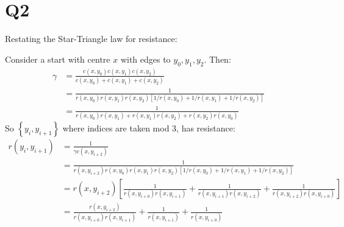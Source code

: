 \documentclass[a4paper, 11pt]{article}
\def\set#1{\left\{ #1 \right\}}
\begin{document}
\pagebreak
\section*{Q2}
Restating the Star-Triangle law for resistance:
\begin{mdframed}
	Consider a start with centre $x$ with edges to $y_0,y_1,y_2$. Then:
	\begin{align*}
		\gamma
		 & = \frac{c(x,y_0)c(x,y_1)c(x,y_2)}{c(x,y_0)+c(x,y_1)+c(x,y_2)}                       \\
		 & = \frac{1}{r(x,y_0)r(x,y_1)r(x,y_2)\left[ 1/r(x,y_0)+1/r(x,y_1)+1/r(x,y_2) \right]} \\
		 & = \frac1{r(x,y_0)r(x,y_1) + r(x,y_1)r(x,y_2) + r(x,y_2)r(x,y_0)}
	\end{align*}
	So $\set{y_i,y_{i+1}}$ where indices are taken mod $3$, has resistance:
	\begin{align*}
		r(y_i,y_{i+1}) & = \frac1{\gamma c(x,y_{i+2})}                                                                                                        \\
		               & = \frac{1}{r(x,y_{i+2})r(x,y_0)r(x,y_1)r(x,y_2)\left[ 1/r(x,y_0)+1/r(x,y_1)+1/r(x,y_2) \right]}                                      \\
		               & = r(x,y_{i+2}) \left[ \frac1{r(x,y_{i+0})r(x,y_{i+1})} + \frac1{r(x,y_{i+1})r(x,y_{i+2})} + \frac1{r(x,y_{i+2})r(x,y_{i+0})} \right] \\
		               & =  \frac{r(x,y_{i+2})}{r(x,y_{i+0})r(x,y_{i+1})} + \frac1{r(x,y_{i+1})} + \frac1{r(x,y_{i+0})}
	\end{align*}


\end{mdframed}
\end{document}
